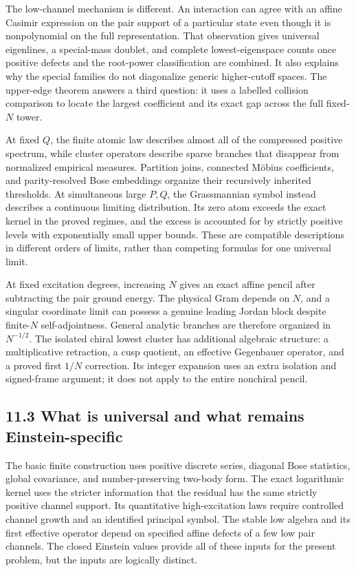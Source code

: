 \documentclass[a4paper,11pt]{article}
\numberwithin{equation}{section}
\begin{document}
The low-channel mechanism is different. An interaction can agree with an affine Casimir expression on the pair support of a particular state even though it is nonpolynomial on the full representation. That observation gives universal eigenlines, a special-mass doublet, and complete lowest-eigenspace counts once positive defects and the root-power classification are combined. It also explains why the special families do not diagonalize generic higher-cutoff spaces. The upper-edge theorem answers a third question: it uses a labelled collision comparison to locate the largest coefficient and its exact gap across the full fixed-\(N\) tower.

At fixed \(Q\), the finite atomic law describes almost all of the compressed positive spectrum, while cluster operators describe sparse branches that disappear from normalized empirical measures. Partition joins, connected Möbius coefficients, and parity-resolved Bose embeddings organize their recursively inherited thresholds. At simultaneous large \(P,Q\), the Grassmannian symbol instead describes a continuous limiting distribution. Its zero atom exceeds the exact kernel in the proved regimes, and the excess is accounted for by strictly positive levels with exponentially small upper bounds. These are compatible descriptions in different orders of limits, rather than competing formulas for one universal limit.

At fixed excitation degrees, increasing \(N\) gives an exact affine pencil after subtracting the pair ground energy. The physical Gram depends on \(N\), and a singular coordinate limit can possess a genuine leading Jordan block despite finite-\(N\) self-adjointness. General analytic branches are therefore organized in \(N^{-1/2}\). The isolated chiral lowest cluster has additional algebraic structure: a multiplicative retraction, a cusp quotient, an effective Gegenbauer operator, and a proved first \(1/N\) correction. Its integer expansion uses an extra isolation and signed-frame argument; it does not apply to the entire nonchiral pencil.

\hypertarget{what-is-universal-and-what-remains-einstein-specific}{%
\subsection{11.3 What is universal and what remains Einstein-specific}\label{what-is-universal-and-what-remains-einstein-specific}}

The basic finite construction uses positive discrete series, diagonal Bose statistics, global covariance, and number-preserving two-body form. The exact logarithmic kernel uses the stricter information that the residual has the same strictly positive channel support. Its quantitative high-excitation laws require controlled channel growth and an identified principal symbol. The stable low algebra and its first effective operator depend on specified affine defects of a few low pair channels. The closed Einstein values provide all of these inputs for the present problem, but the inputs are logically distinct.
\end{document}
